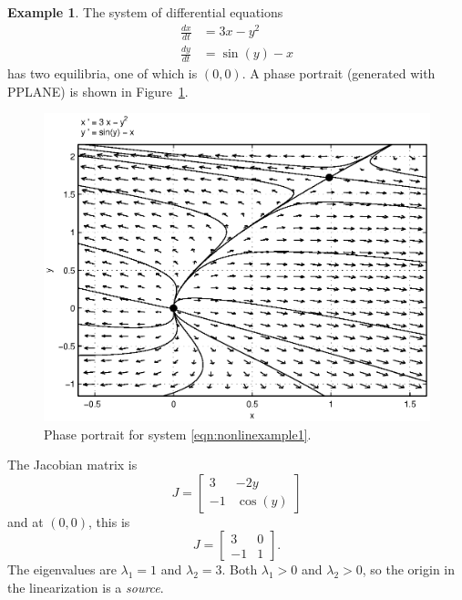 \documentclass[reqno]{immbook}
\numberwithin{equation}{chapter}
\numberwithin{question}{section}
\numberwithin{theorem}{chapter}
\numberwithin{figure}{chapter}
\theoremstyle{definition}
\newtheorem{example}{Example}[section]
\begin{document}
\begin{example}
The system of differential equations
\begin{equation}
\begin{split}
   \frac{dx}{dt} & = 3x-y^2 \\
   \frac{dy}{dt} & = \sin(y)-x
\end{split}
\label{eqn:nonlinexample1}
\end{equation}
has two equilibria, one of which is  $(0,0)$.
A phase portrait (generated with PPLANE) is shown in
Figure~\ref{fig:nonlinexample1}.
\begin{figure}
\centerline{%
\includegraphics[width=5in]{pplane_plots/NonlinExample1.ps}
}
\caption{Phase portrait for system \eqref{eqn:nonlinexample1}.}
\label{fig:nonlinexample1}
\end{figure}
  The Jacobian matrix is
\begin{equation}
  J = \begin{bmatrix}
           3 &  -2y \\
	   -1 & \cos(y)
      \end{bmatrix}
\end{equation}
and at $(0,0)$, this is
\begin{equation}
  J = \begin{bmatrix}
           3 &  0 \\
	   -1 & 1
      \end{bmatrix}.
\end{equation}
The eigenvalues are $\lambda_1=1$ and $\lambda_2=3$.
Both $\lambda_1>0$ and $\lambda_2>0$, so the origin
in the linearization is a \emph{source}.

\end{example}
\end{document}
